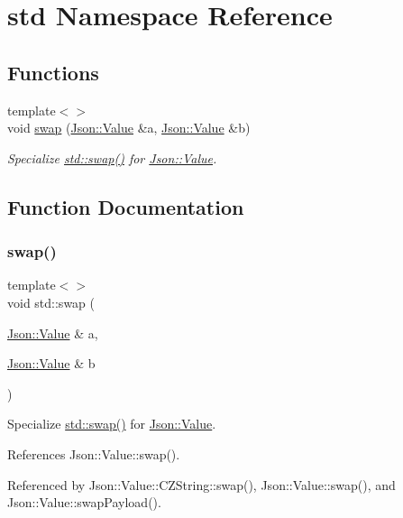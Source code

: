 \hypertarget{namespacestd}{}\section{std Namespace Reference}
\label{namespacestd}
\subsection*{Functions}
\begin{DoxyCompactItemize}
\item 
{\footnotesize template$<$$>$ }\\void \hyperlink{namespacestd_a22cc6fcbbb1f2f705c7888b615e43582_a22cc6fcbbb1f2f705c7888b615e43582}{swap} (\hyperlink{classJson_1_1Value}{Json\+::\+Value} \&a, \hyperlink{classJson_1_1Value}{Json\+::\+Value} \&b)
\begin{DoxyCompactList}\small\item\em Specialize \hyperlink{namespacestd_a22cc6fcbbb1f2f705c7888b615e43582_a22cc6fcbbb1f2f705c7888b615e43582}{std\+::swap()} for \hyperlink{classJson_1_1Value}{Json\+::\+Value}. \end{DoxyCompactList}\end{DoxyCompactItemize}


\subsection{Function Documentation}
\mbox{\label{namespacestd_a22cc6fcbbb1f2f705c7888b615e43582_a22cc6fcbbb1f2f705c7888b615e43582}} 
\subsubsection{\texorpdfstring{swap()}{swap()}}
{\footnotesize\ttfamily template$<$$>$ \\
void std\+::swap (\begin{DoxyParamCaption}\item[{\hyperlink{classJson_1_1Value}{Json\+::\+Value} \&}]{a,  }\item[{\hyperlink{classJson_1_1Value}{Json\+::\+Value} \&}]{b }\end{DoxyParamCaption})\hspace{0.3cm}{\ttfamily [inline]}}



Specialize \hyperlink{namespacestd_a22cc6fcbbb1f2f705c7888b615e43582_a22cc6fcbbb1f2f705c7888b615e43582}{std\+::swap()} for \hyperlink{classJson_1_1Value}{Json\+::\+Value}. 



References Json\+::\+Value\+::swap().



Referenced by Json\+::\+Value\+::\+C\+Z\+String\+::swap(), Json\+::\+Value\+::swap(), and Json\+::\+Value\+::swap\+Payload().


